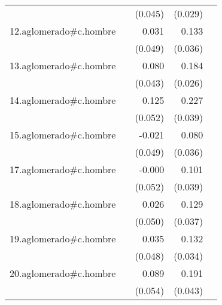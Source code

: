 {\begin{longtable}{l*{4}{D{.}{.}{-1}}}
            &                     &     (0.045)         &     (0.029)         &                     \\
\addlinespace
12.aglomerado#c.hombre&                     &       0.031         &       0.133\sym{***}&                     \\
            &                     &     (0.049)         &     (0.036)         &                     \\
\addlinespace
13.aglomerado#c.hombre&                     &       0.080         &       0.184\sym{***}&                     \\
            &                     &     (0.043)         &     (0.026)         &                     \\
\addlinespace
14.aglomerado#c.hombre&                     &       0.125\sym{*}  &       0.227\sym{***}&                     \\
            &                     &     (0.052)         &     (0.039)         &                     \\
\addlinespace
15.aglomerado#c.hombre&                     &      -0.021         &       0.080\sym{*}  &                     \\
            &                     &     (0.049)         &     (0.036)         &                     \\
\addlinespace
17.aglomerado#c.hombre&                     &      -0.000         &       0.101\sym{**} &                     \\
            &                     &     (0.052)         &     (0.039)         &                     \\
\addlinespace
18.aglomerado#c.hombre&                     &       0.026         &       0.129\sym{***}&                     \\
            &                     &     (0.050)         &     (0.037)         &                     \\
\addlinespace
19.aglomerado#c.hombre&                     &       0.035         &       0.132\sym{***}&                     \\
            &                     &     (0.048)         &     (0.034)         &                     \\
\addlinespace
20.aglomerado#c.hombre&                     &       0.089         &       0.191\sym{***}&                     \\
            &                     &     (0.054)         &     (0.043)         &                     \\

\end{longtable}}
